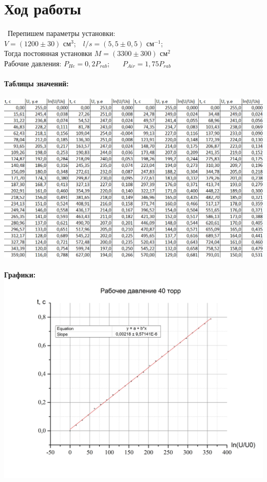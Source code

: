 \documentclass[11pt]{article}
\begin{document}
\section*{Ход работы}\
Перепишем параметры установки:\\
$V=(1200\pm 30)$ см$^3$;\ \ $l/s=(5,5\pm 0,5)$ см$^{-1}$; \\
Тогда постоянная установки $M=(3300\pm 300)$ см$^2$\\
Рабочие давления: $P_{He}=0,2P_{rab}$; \ \ \ $P_{Air}=1,75P_{rab}$\\
\ \\
\textbf{Таблицы значений:}\\
\ \\
\includegraphics[scale=0.8]{table.png}\\
\ \\
\newpage
\textbf{Графики:}\\
\includegraphics[scale=0.55]{Graph5.jpg}\\
\end{document}
